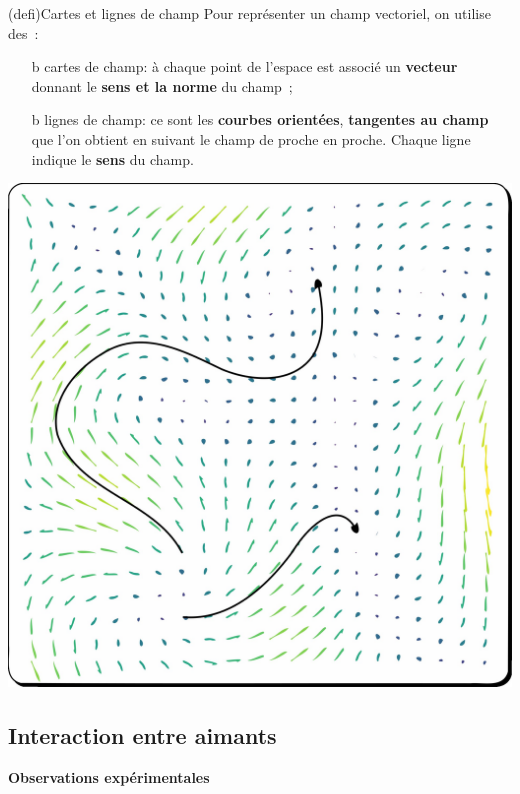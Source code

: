 \documentclass[../../main/main.tex]{subfiles}
\begin{document}
\begin{tcb*}[sidebyside, righthand ratio=.3](defi){Cartes et lignes de champ}
  Pour représenter un champ vectoriel, on utilise des~:
  \begin{itemize}
    \item[b]{cartes de champ}: à chaque point de l'espace est associé un
      \textbf{vecteur} donnant le \textbf{sens et la norme} du champ~;

    \item[b]{lignes de champ}: ce sont les \textbf{courbes orientées},
      \textbf{tangentes au champ} que l'on
      obtient en suivant le champ de proche en proche. Chaque ligne indique le
      \textbf{sens} du champ.
  \end{itemize}
  \tcblower
  \begin{center}
    \includegraphics[width=\linewidth]{ldc_qlcq}
  \end{center}
\end{tcb*}

\subsection{Interaction entre aimants}
\textbf{Observations expérimentales}
\end{document}
